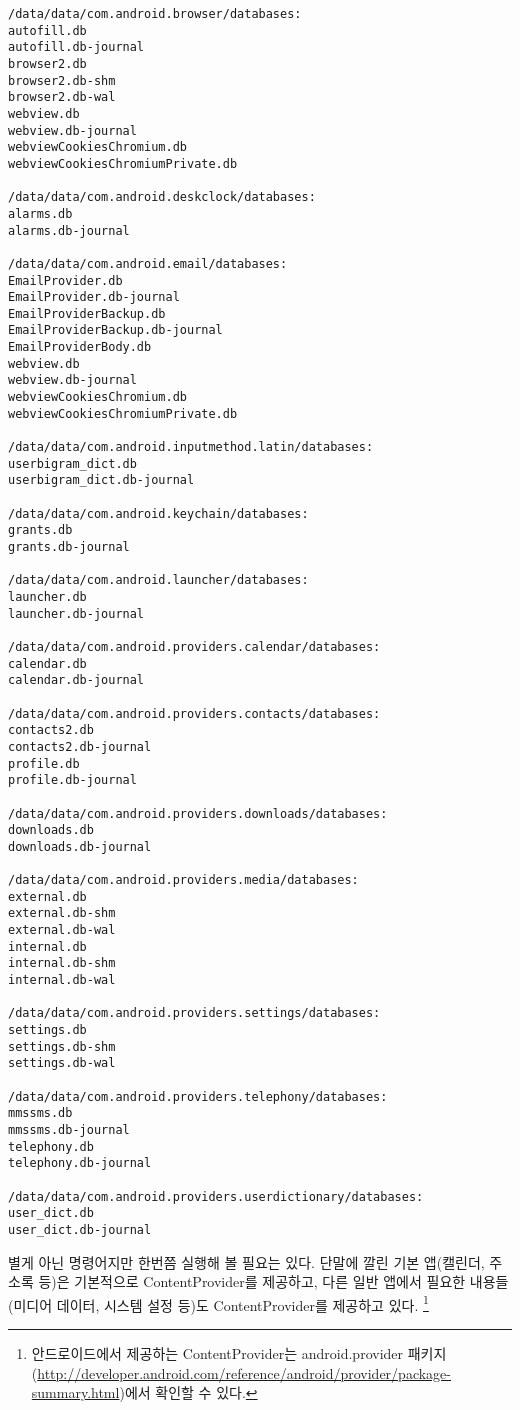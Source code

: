 \begin{lstlisting}[frame=single] 
/data/data/com.android.browser/databases:
autofill.db
autofill.db-journal
browser2.db
browser2.db-shm
browser2.db-wal
webview.db
webview.db-journal
webviewCookiesChromium.db
webviewCookiesChromiumPrivate.db

/data/data/com.android.deskclock/databases:
alarms.db
alarms.db-journal

/data/data/com.android.email/databases:
EmailProvider.db
EmailProvider.db-journal
EmailProviderBackup.db
EmailProviderBackup.db-journal
EmailProviderBody.db
webview.db
webview.db-journal
webviewCookiesChromium.db
webviewCookiesChromiumPrivate.db

/data/data/com.android.inputmethod.latin/databases:
userbigram_dict.db
userbigram_dict.db-journal

/data/data/com.android.keychain/databases:
grants.db
grants.db-journal

/data/data/com.android.launcher/databases:
launcher.db
launcher.db-journal

/data/data/com.android.providers.calendar/databases:
calendar.db
calendar.db-journal

/data/data/com.android.providers.contacts/databases:
contacts2.db
contacts2.db-journal
profile.db
profile.db-journal

/data/data/com.android.providers.downloads/databases:
downloads.db
downloads.db-journal

/data/data/com.android.providers.media/databases:
external.db
external.db-shm
external.db-wal
internal.db
internal.db-shm
internal.db-wal

/data/data/com.android.providers.settings/databases:
settings.db
settings.db-shm
settings.db-wal

/data/data/com.android.providers.telephony/databases:
mmssms.db
mmssms.db-journal
telephony.db
telephony.db-journal

/data/data/com.android.providers.userdictionary/databases:
user_dict.db
user_dict.db-journal
\end{lstlisting}
별게 아닌 명령어지만 한번쯤 실행해 볼 필요는 있다. 
단말에 깔린 기본 앱(캘린더, 주소록 등)은 기본적으로 ContentProvider를 제공하고, 다른 일반 앱에서 필요한 내용들(미디어 데이터, 시스템 설정 등)도 ContentProvider를 제공하고 있다.
\footnote{안드로이드에서 제공하는 ContentProvider는 android.provider 패키지(\url{http://developer.android.com/reference/android/provider/package-summary.html})에서 확인할 수 있다.}\\

